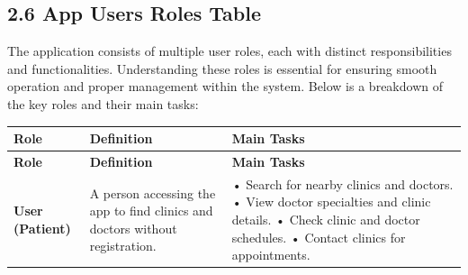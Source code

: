 \documentclass[12pt]{report}
\begin{document}
\newpage
\subsection*{2.6 App Users Roles Table}
\noindent The application consists of multiple user roles, each with distinct responsibilities and functionalities. Understanding these roles is essential for ensuring smooth operation and proper management within the system. Below is a breakdown of the key roles and their main tasks:
\vspace{0.2cm}
\renewcommand{\arraystretch}{1.3} %

\begin{longtable}{|p{3cm}|p{6cm}|p{6cm}|}

	\hline
	\rowcolor[HTML]{C0C0C0}
	\hspace*{1cm}\textbf{Role}                                                                                 & \hspace*{1.9cm} \textbf{Definition}                                                 & \hspace*{1.9cm}\textbf{Main Tasks} \\
	\hline
	\endfirsthead

	\hline
	\rowcolor[HTML]{C0C0C0}
	\hspace*{1cm}\textbf{Role}                                                                                 & \hspace*{1.9cm} \textbf{Definition}                                                 & \hspace*{1.9cm}\textbf{Main Tasks} \\
	\hline
	\endhead

	\hspace*{0.1cm}\textbf{User (Patient)}                                                                     & A person accessing the app to find clinics and doctors without registration.        &
	• Search for nearby clinics and doctors.\newline
	• View doctor specialties and clinic details.\newline
	• Check clinic and doctor schedules.\newline
	• Contact clinics for appointments.                                                                                                                                                                                                   \\
	\hline


\end{longtable}
\end{document}
